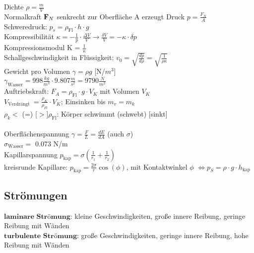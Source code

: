 \documentclass[fs, footer]{latex4ei}
\begin{document}
\begin{multicols*}{4}
Dichte $\rho = \frac{m}{V}$\\
Normalkraft $\textbf{F}_N$ senkrecht zur Oberfläche A erzeugt Druck $p = \frac{F_N}{A}$\\
Schweredruck: $p_s = \rho_{\text{Fl}}\cdot h\cdot g$\\
Kompressibilität $\kappa = -\frac{1}{p}\cdot \frac{\Delta V}{V} \rightarrow \frac{\delta V}{V}=-\kappa\cdot \delta p$\\
Kompressionsmodul K = $\frac{1}{\kappa}$\\
Schallgeschwindigkeit in Flüssigkeit: $v_0 = \sqrt{\frac{dp}{d\rho}} = \sqrt{\frac{1}{\rho\kappa}}$\\
Gewicht pro Volumen $\gamma = \rho g$ [N/$m^3$]\\
$\gamma_{\text{Wasser}} = 998\frac{kg}{m^3}\cdot 9.807\frac{m}{s^2} = 9790 \frac{N}{m^2}$\\
Auftriebskraft: $F_A = \rho_{\text{Fl}}\cdot g\cdot V_K$ mit Volumen $V_K$\\
$V_{\text{Verdrängt }} = \frac{\rho_K}{\rho_{Fl}}\cdot V_K$; Einsinken bis $m_v = m_k$\\
$\rho_k < $ (=) [$>$]$ \rho_{\text{Fl}}$: Körper schwimmt (schwebt) [sinkt]\\ %
\\
Oberflächenspannung $\gamma = \frac{F}{L} = \frac{dE}{dA}$ (auch $\sigma$)\\
$\sigma_{\text{Wasser}} =$ 0.073 N/m\\
Kapillarspannung $p_{\text{kap}} = \sigma(\frac{1}{r_1}+\frac{1}{r_2})$\\
kreisrunde Kapillare: $p_{\text{kap}} = \frac{2\sigma}{r}\cos (\phi)$, mit Kontaktwinkel $\phi$ $\Leftrightarrow p_S = \rho\cdot g\cdot h_{\text{kap}}$\\

\subsection{Strömungen}
$\textbf{laminare Strömung:}$ kleine Geschwindigkeiten, große innere Reibung, geringe Reibung mit Wänden\\
$\textbf{turbulente Strömung:}$ große Geschwindigkeiten, geringe innere Reibung, hohe Reibung mit Wänden\\


\end{multicols*}
\end{document}
